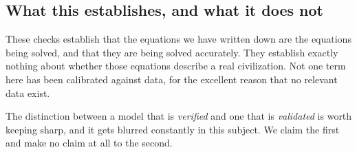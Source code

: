 \subsection{What this establishes, and what it does not}

These checks establish that the equations we have written down are the equations
being solved, and that they are being solved accurately. They establish exactly
nothing about whether those equations describe a real civilization. Not one term
here has been calibrated against data, for the excellent reason that no relevant
data exist.

The distinction between a model that is \emph{verified} and one that is
\emph{validated} is worth keeping sharp, and it gets blurred constantly in this
subject. We claim the first and make no claim at all to the second.
\Established
